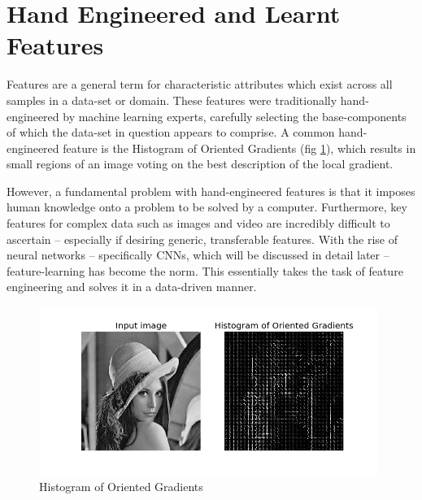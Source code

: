\documentclass{report}
\begin{document}
	\section{Hand Engineered and Learnt Features}
	Features are a general term for characteristic attributes which exist across all samples in a data-set or domain. These features were traditionally hand-engineered by machine learning experts, carefully selecting the base-components of which the data-set in question appears to comprise. A common hand-engineered feature is the Histogram of Oriented Gradients (fig \ref{fig:hog:1}), which results in small regions of an image voting on the best description of the local gradient. \par
	However, a fundamental problem with hand-engineered features is that it imposes human knowledge onto a problem to be solved by a computer. Furthermore, key features for complex data such as images and video are incredibly difficult to ascertain -- especially if desiring generic, transferable features. With the rise of neural networks -- specifically CNNs, which will be discussed in detail later -- feature-learning has become the norm. This essentially takes the task of feature engineering and solves it in a data-driven manner. \par
	\begin{figure}[!h]
		\centering
		\includegraphics[width=11cm]{hog}
		\caption{Histogram of Oriented Gradients}
		\label{fig:hog:1}
	\end{figure}
\end{document}
